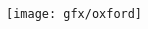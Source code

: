 \begin{titlepage}
    \begin{addmargin}[-1cm]{0cm}
    \begin{center}
        \large

        \hfill

        \vfill

        \begingroup
            \spacedallcaps{\myTitle} \\ \bigskip
        \endgroup



        \vfill

        \texttt{[image: gfx/oxford]} \\ \bigskip \bigskip \bigskip

        \spacedlowsmallcaps{\myName} \\
        \vspace{2pt}
        \myCollege \\
        \myUni \\ \bigskip

        \bigskip \bigskip \bigskip \bigskip %
        \myDegree \\ \bigskip \bigskip
        \myTime\\
        \vfill

    \end{center}
 \end{addmargin}       
\end{titlepage}
